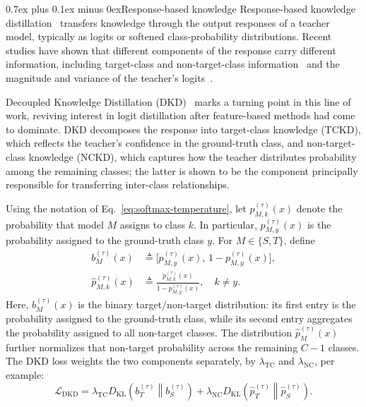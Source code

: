 \documentclass[10pt,journal,compsoc]{IEEEtran}
\makeatletter
\def\subsection{\@startsection{subsection}{2}{\z@}{-3.5ex plus -0.5ex minus -1.5ex}%
{0.7ex plus 0.1ex minus 0ex}{\normalfont\normalsize\sffamily\bfseries}}
\theoremstyle{definition}
\makeatother
\begin{document}
\vspace{-5pt}
\subsection{Response-based knowledge}
Response-based knowledge distillation~\cite{hinton2015distilling} transfers knowledge through the output responses of a teacher model, typically as logits or softened class-probability distributions. Recent studies have shown that different components of the response carry different information, including target-class and non-target-class information~\cite{zhao2022decoupled} and the magnitude and variance of the teacher's
logits~\cite{sun2024logit}.

Decoupled Knowledge Distillation (DKD)~\cite{zhao2022decoupled} marks a turning point in this line of work, reviving interest in logit distillation after feature-based methods had come to dominate. DKD decomposes the response into target-class knowledge (TCKD), which reflects the teacher's confidence in the ground-truth class, and non-target-class knowledge (NCKD), which captures how the teacher distributes probability among the remaining classes; the latter is shown to be the component principally responsible for transferring inter-class relationships.

Using the notation of Eq.~\eqref{eq:softmax-temperature}, let
$p_{M,k}^{(\tau)}(x)$ denote the probability that model $M$ assigns to class
$k$. In particular, $p_{M,y}^{(\tau)}(x)$ is the probability assigned to the
ground-truth class $y$. For $M\in\{S,T\}$, define
\begin{equation}
\begin{aligned}
b_M^{(\tau)}(x)
&\triangleq \bigl[p_{M,y}^{(\tau)}(x),\,1-p_{M,y}^{(\tau)}(x)\bigr], \\
\hat p_{M,k}^{(\tau)}(x)
&\triangleq \frac{p_{M,k}^{(\tau)}(x)}{1-p_{M,y}^{(\tau)}(x)},
\quad k\neq y.
\end{aligned}
\end{equation}
Here, $b_M^{(\tau)}(x)$ is the binary target/non-target distribution: its
first entry is the probability assigned to the ground-truth class, while its
second entry aggregates the probability assigned to all non-target classes.
The distribution $\hat p_M^{(\tau)}(x)$ further normalizes that non-target
probability across the remaining $C-1$ classes.
The DKD loss weights the two components separately, by
$\lambda_{\mathrm{TC}}$ and $\lambda_{\mathrm{NC}}$, per example:
\begin{equation}
\label{eq:dkd-loss}
\mathcal L_{\mathrm{DKD}}
= \lambda_{\mathrm{TC}}D_{\mathrm{KL}}\!\left(b_T^{(\tau)}\middle\|b_S^{(\tau)}\right)
+ \lambda_{\mathrm{NC}}D_{\mathrm{KL}}\!\left(\hat p_T^{(\tau)}\middle\|\hat p_S^{(\tau)}\right).
\end{equation}
\end{document}
